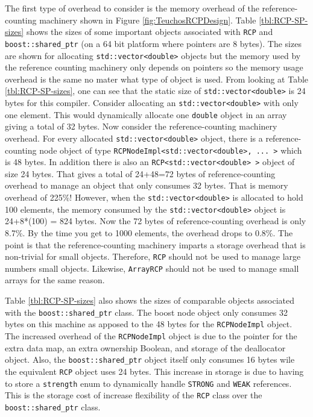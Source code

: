 \documentclass[pdf,ps2pdf,11pt]{SANDreport}
\begin{document}
The first type of overhead to consider is the memory overhead of the
reference-counting machinery shown in Figure
{}\ref{fig:TeuchosRCPDesign}.  Table {}\ref{tbl:RCP-SP-sizes} shows
the sizes of some important objects associated with {}\texttt{RCP} and
{}\texttt{boost::shared\_ptr} (on a 64 bit platform where pointers are
8 bytes).  The sizes are shown for allocating
{}\texttt{std::vector<double>} objects but the memory used by the
reference counting machinery only depends on pointers so the memory
usage overhead is the same no mater what type of object is used.  From
looking at Table {}\ref{tbl:RCP-SP-sizes}, one can see that the static
size of {}\texttt{std::vector<double>} is 24 bytes for this compiler.
Consider allocating an {}\texttt{std::vector<double>} with only one
element.  This would dynamically allocate one {}\texttt{double} object
in an array giving a total of 32 bytes.  Now consider the
reference-counting machinery overhead.  For every allocated
{}\texttt{std::vector<double>} object, there is a reference-counting
node object of type {}\texttt{RCPNodeImpl<std::vector<double>, ... >}
which is 48 bytes.  In addition there is also an
{}\texttt{RCP<std::vector<double> >} object of size 24 bytes.  That
gives a total of 24+48=72 bytes of reference-counting overhead to
manage an object that only consumes 32 bytes.  That is memory overhead
of 225\%!  However, when the {}\texttt{std::vector<double>} is
allocated to hold 100 elements, the memory consumed by the
{}\texttt{std::vector<double>} object is 24+8*(100) = 824 bytes.  Now
the 72 bytes of reference-counting overhead is only 8.7\%.  By the
time you get to 1000 elements, the overhead drops to 0.8\%.  The point
is that the reference-counting machinery imparts a storage overhead
that is non-trivial for small objects.  Therefore, {}\texttt{RCP}
should not be used to manage large numbers small objects.  Likewise,
{}\texttt{ArrayRCP} should not be used to manage small arrays for the
same reason.

Table {}\ref{tbl:RCP-SP-sizes} also shows the sizes of comparable
objects associated with the {}\texttt{boost::shared\_ptr} class.  The
boost node object only consumes 32 bytes on this machine as apposed to
the 48 bytes for the {}\texttt{RCPNodeImpl} object.  The increased
overhead of the {}\texttt{RCPNodeImpl} object is due to the pointer
for the extra data map, an extra ownership Boolean, and storage of the
deallocator object.  Also, the {}\texttt{boost::shared\_ptr} object
itself only consumes 16 bytes wile the equivalent {}\texttt{RCP}
object uses 24 bytes.  This increase in storage is due to having to
store a {}\texttt{strength} enum to dynamically handle
{}\texttt{STRONG} and {}\texttt{WEAK} references.  This is the storage
cost of increase flexibility of the {}\texttt{RCP} class over the
{}\texttt{boost::shared\_ptr} class.
\end{document}
